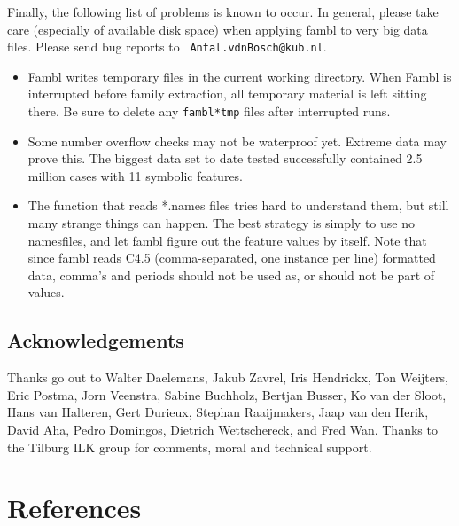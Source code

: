 \documentclass[11pt]{article}
\begin{document}
Finally, the following list of problems is known to occur. In general,
please take care (especially of available disk space) when applying
{\sc fambl} to very big data files. Please send bug reports to  {\tt
Antal.vdnBosch@kub.nl}.

\begin{itemize}
\item
Fambl writes temporary files in the current working directory. When
Fambl is interrupted before family extraction, all temporary material
is left sitting there. Be sure to delete any {\tt fambl*tmp} files after
interrupted runs.
\item
Some number overflow checks may not be waterproof yet. Extreme data may
prove this. The biggest data set to date tested successfully contained
2.5 million cases with 11 symbolic features.
\item
The function that reads *.names files tries hard to understand them,
but still many strange things can happen. The best strategy is simply
to use no namesfiles, and let {\sc fambl} figure out the feature values by
itself. Note that since {\sc fambl} reads C4.5 (comma-separated, one
instance per line) formatted data, comma's and periods should not be used
as, or should not be part of values.
\end{itemize}

\subsection*{Acknowledgements}

Thanks go out to Walter Daelemans, Jakub Zavrel, Iris Hendrickx, Ton
Weijters, Eric Postma, Jorn Veenstra, Sabine Buchholz, Bertjan Busser,
Ko van der Sloot, Hans van Halteren, Gert Durieux, Stephan
Raaijmakers, Jaap van den Herik, David Aha, Pedro Domingos, Dietrich
Wettschereck, and Fred Wan. Thanks to the Tilburg ILK group for
comments, moral and technical support.

\section*{References}
\label{refs}
\end{document}

